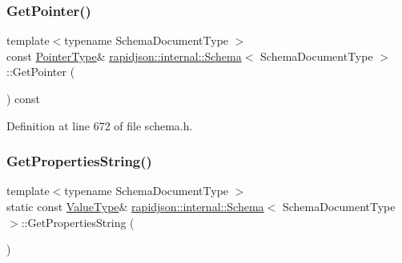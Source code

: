 \subsubsection{\texorpdfstring{GetPointer()}{GetPointer()}}
{\footnotesize\ttfamily template$<$typename Schema\+Document\+Type $>$ \\
const \mbox{\hyperlink{classrapidjson_1_1internal_1_1_schema_aa54c71c41aa8a9091565d12ffe27627c}{Pointer\+Type}}\& \mbox{\hyperlink{classrapidjson_1_1internal_1_1_schema}{rapidjson\+::internal\+::\+Schema}}$<$ Schema\+Document\+Type $>$\+::Get\+Pointer (\begin{DoxyParamCaption}{ }\end{DoxyParamCaption}) const}



Definition at line 672 of file schema.\+h.


\begin{DoxyCode}{0}

\end{DoxyCode}
\mbox{\label{classrapidjson_1_1internal_1_1_schema_a1430ad3f2bb39e6b3a39130d8c9ad973}} 
\subsubsection{\texorpdfstring{GetPropertiesString()}{GetPropertiesString()}}
{\footnotesize\ttfamily template$<$typename Schema\+Document\+Type $>$ \\
static const \mbox{\hyperlink{classrapidjson_1_1internal_1_1_schema_a3979a9083c598195927c08c6e3ba91d1}{Value\+Type}}\& \mbox{\hyperlink{classrapidjson_1_1internal_1_1_schema}{rapidjson\+::internal\+::\+Schema}}$<$ Schema\+Document\+Type $>$\+::Get\+Properties\+String (\begin{DoxyParamCaption}{ }\end{DoxyParamCaption})\hspace{0.3cm}{\ttfamily [static]}}



